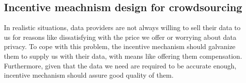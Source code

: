 \documentclass[10pt,conference,compsocconf,letterpaper]{IEEEtran}
\begin{document}
\subsection{Incentive meachnism design for crowdsourcing}
In realistic situations, data providers are not always willing to sell their data to us for reasons like dissatisfying with the price we offer %
or worrying about data privacy. To cope with this problem, the incentive mechanism should galvanize them to supply us with their data, with means like offering them compensation. Furthermore, given that the data we need are required to be accurate enough, incentive mechanism should assure good quality of them. %
\end{document}
